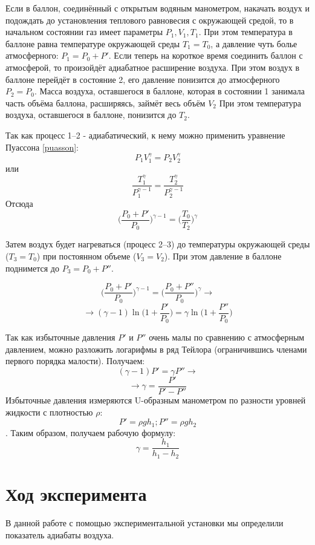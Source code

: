 \documentclass[a4paper,12pt]{article}
\begin{document}
Если в баллон, соединённый с открытым водяным манометром, накачать воздух и подождать до установления теплового равновесия с окружающей средой, то в начальном состоянии газ имеет параметры $P_1, V_1, T_1$. При этом температура в баллоне равна температуре окружающей среды $T_1 = T_0$, а давление чуть болье атмосферного: $P_1 = P_0 + P'$. Если теперь на короткое время соединить баллон с
атмосферой, то произойдёт адиабатное расширение воздуха. При этом воздух в баллоне перейдёт в состояние 2, его давление
понизится до атмосферного $P_2 = P_0$. Масса воздуха, оставшегося в
баллоне, которая в состоянии 1 занимала часть объёма баллона,
расширяясь, займёт весь объём $V_2$ При этом температура воздуха,
оставшегося в баллоне, понизится до $T_2$.

Так как процесс 1--2 - адиабатический, к нему можно применить уравнение Пуассона \eqref{puasson}:
$$P_1V_1^\gamma = P_2V_2^\gamma$$
или
$$\frac{T_1^\gamma}{P_1^{\gamma-1}} = \frac{T_2^\gamma}{P_2^{\gamma-1}}$$
Отсюда
$$\bigg(\frac{P_0 + P'}{P_0}\bigg)^{\gamma-1} = \bigg(\frac{T_0}{T_2}\bigg)^{\gamma}$$

Затем воздух будет нагреваться (процесс 2--3) до температуры окружающей среды ($T_3 = T_0$) при постоянном объеме ($V_3 = V_2$). При этом давление в баллоне поднимется до $P_3 = P_0 + P''$.

$$\bigg(\frac{P_0 + P'}{P_0}\bigg)^{\gamma-1} = \bigg(\frac{P_0 + P''}{P_0}\bigg)^{\gamma} \rightarrow$$
$$\rightarrow (\gamma - 1)\ln\bigg(1+\frac{P'}{P_0}\bigg) = \gamma\ln\bigg(1+\frac{P''}{P_0}\bigg)$$

Так как избыточные давления $P'$ и $P''$ очень малы по сравнению с атмосферным давлением, можно разложить логарифмы в ряд Тейлора (ограничившись членами первого порядка малости). Получаем:
$$(\gamma-1)P' = \gamma P'' \rightarrow$$
$$\rightarrow \gamma = \frac{P'}{P' - P''}$$
Избыточные давления измеряются U-образным манометром по разности уровней жидкости с плотностью $\rho$:
$$P' = \rho gh_1; P'' = \rho g h_2$$.
Таким образом, получаем рабочую формулу:
\begin{equation}\label{rab_form}
\gamma = \frac{h_1}{h_1-h_2}
\end{equation}

\newpage
\section{Ход эксперимента}
\hspace{\parindent}В данной работе с помощью экспериментальной установки мы определили показатель адиабаты воздуха.
\end{document}
